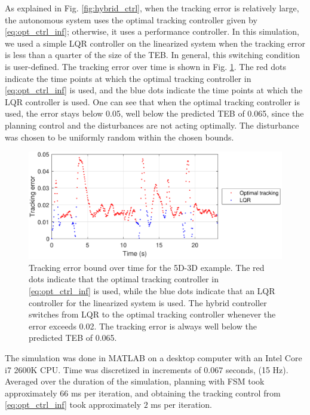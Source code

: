 As explained in Fig. \ref{fig:hybrid_ctrl}, when the tracking error is relatively large, the autonomous system uses the optimal tracking controller given by \eqref{eq:opt_ctrl_inf}; otherwise, it uses a performance controller. 
In this simulation, we used a simple LQR controller on the linearized system when the tracking error is less than a quarter of the size of the TEB.
In general, this switching condition is user-defined.
The tracking error over time is shown in Fig. \ref{fig:P5D_Dubins_tracking_error}.
The red dots indicate the time points at which the optimal tracking controller in \eqref{eq:opt_ctrl_inf} is used, and the blue dots indicate the time points at which the LQR controller is used. 
One can see that when the optimal tracking controller is used, the error stays below 0.05, well below the predicted TEB of 0.065, since the planning control and the disturbances are not acting optimally.
The disturbance was chosen to be uniformly random within the chosen bounds.

\begin{figure}
  \includegraphics[width=\columnwidth]{fig/P5D_Dubins/tracking_error}
  \caption{Tracking error bound over time for the 5D-3D example. The red dots indicate that the optimal tracking controller in \eqref{eq:opt_ctrl_inf} is used, while the blue dots indicate that an LQR controller for the linearized system is used. The hybrid controller switches from LQR to the optimal tracking controller whenever the error exceeds 0.02. The tracking error is always well below the predicted TEB of 0.065.}
  \label{fig:P5D_Dubins_tracking_error}
\end{figure}

The simulation was done in MATLAB on a desktop computer with an Intel Core i7 2600K CPU.
Time was discretized in increments of $0.067$ seconds, (15 Hz).
Averaged over the duration of the simulation, planning with FSM took approximately $66$ ms per iteration, and obtaining the tracking control from \eqref{eq:opt_ctrl_inf} took approximately $2$ ms per iteration.
